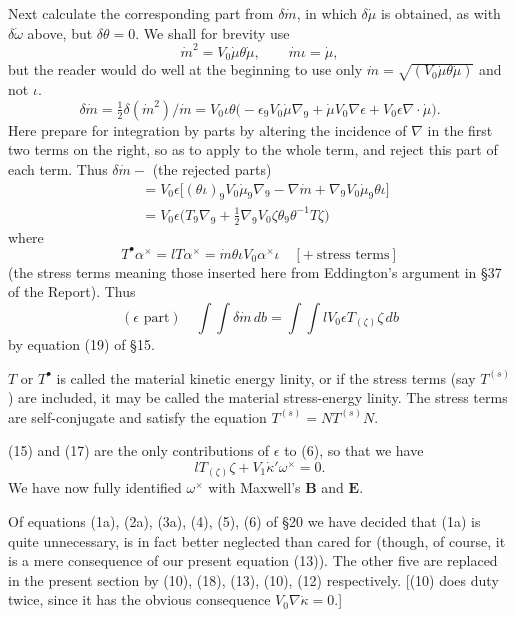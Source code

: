 \documentclass[11pt]{article}
\begin{document}
Next calculate the corresponding part from $\delta\dot m$, in which $\delta\dot\mu$ is obtained, as with $\delta\dot\omega$ above, but $\delta\theta=0$. We shall for brevity use
\[
  \dot m^2=V_0\dot\mu\theta\dot\mu,\qquad \dot m\iota=\dot\mu,
\]
but the reader would do well at the beginning to use only $\dot m=\sqrt{(V_0\dot\mu\theta\dot\mu)}$ and not $\iota$.
\[
  \delta\dot m=\tfrac12\delta(\dot m^2)/\dot m
  =V_0\iota\theta\bigl(-\epsilon_9V_0\dot\mu\nabla_9+\dot\mu V_0\nabla\epsilon+V_0\epsilon\nabla\mathbin{\cdot}\dot\mu\bigr).
\]
Here prepare for integration by parts by altering the incidence of $\nabla$ in the first two terms on the right, so as to apply to the whole term, and reject this part of each term. Thus $\delta\dot m-$ (the rejected parts)
\[
  \begin{aligned}
    &=V_0\epsilon\bigl[(\theta\iota)_9V_0\dot\mu_9\nabla_9-\nabla\dot m+\nabla_9V_0\dot\mu_9\theta\iota\bigr]\\
    &=V_0\epsilon\bigl(T_9\nabla_9+\tfrac12\nabla_9V_0\zeta\theta_9\theta^{-1}T\zeta\bigr)
  \end{aligned}
\]
where
\begin{equation}
  T^\bullet\alpha^\times=lT\alpha^\times=\dot m\theta\iota V_0\alpha^\times\iota\quad[+\ \text{stress terms}]
  \tag{16}
\end{equation}
(the stress terms meaning those inserted here from Eddington's argument in §37 of the Report). Thus
\begin{equation}
  (\epsilon\text{ part})\quad\int\!\int\delta\dot m\,db
  =\int\!\int lV_0\epsilon T_{(\zeta)}\zeta\,db
  \tag{17}
\end{equation}
by equation (19) of §15.

\indent $T$ or $T^\bullet$ is called the material kinetic energy linity, or if the stress terms (say $T^{(s)}$) are included, it may be called the material stress-energy linity. The stress terms are self-conjugate and satisfy the equation $T^{(s)}=NT^{(s)}N$.

\indent (15) and (17) are the only contributions of $\epsilon$ to (6), so that we have
\begin{equation}
  lT_{(\zeta)}\zeta+V_1\dot\kappa'\omega^\times=0.
  \tag{18}
\end{equation}
We have now fully identified $\omega^\times$ with Maxwell's $\mathbf{B}$ and $\mathbf{E}$.

\indent Of equations (1a), (2a), (3a), (4), (5), (6) of §20 we have decided that (1a) is quite unnecessary, is in fact better neglected than cared for (though, of course, it is a mere consequence of our present equation (13)). The other five are replaced in the present section by (10), (18), (13), (10), (12) respectively. [(10) does duty twice, since it has the obvious consequence $V_0\nabla\dot\kappa=0$.]
\end{document}
